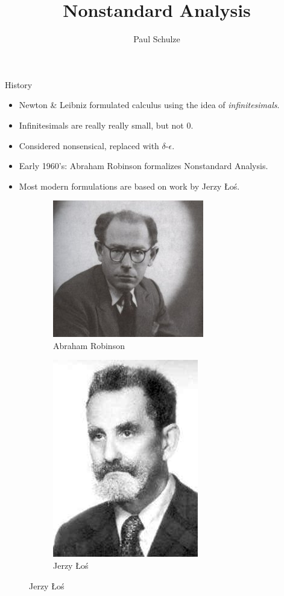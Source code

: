 \documentclass{beamer}
\title{Nonstandard Analysis}
\author{Paul Schulze}
\date{}
\theoremstyle{plain}
\theoremstyle{definition}
\begin{document}
	
\begin{frame}
	\titlepage
\end{frame}
	
	
\begin{frame}{History}
	\begin{itemize}
		\item Newton \& Leibniz formulated calculus using the idea of \textit{infinitesimals}.
		\item Infinitesimals are really really small, but not $0$.
		\item Considered nonsensical, replaced with $\delta$-$\epsilon$.
		\item Early 1960's: Abraham Robinson formalizes Nonstandard Analysis.
		\item Most modern formulations are based on work by Jerzy \L o\'s.
	\end{itemize}
	\begin{figure}[h]
		\begin{subfigure}{0.4\textwidth}
			\centering
			\includegraphics[width=0.6\linewidth]{Robinson}
			\caption{Abraham Robinson}
		\end{subfigure}
		\begin{subfigure}{0.4\textwidth}
			\centering
			\includegraphics[width=0.4\linewidth]{Los}
			\caption{Jerzy \L o\'s}
		\end{subfigure}
	\end{figure}
\end{frame}
\end{document}
